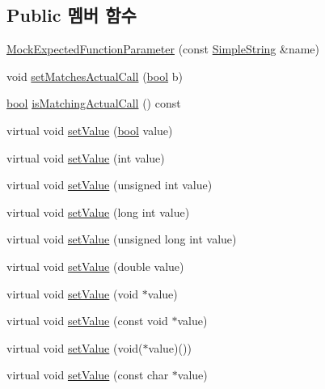 \subsection*{Public 멤버 함수}
\begin{DoxyCompactItemize}
\item 
\hyperlink{class_mock_checked_expected_call_1_1_mock_expected_function_parameter_aed30108e93c74e559acf61e736449ac5}{Mock\+Expected\+Function\+Parameter} (const \hyperlink{class_simple_string}{Simple\+String} \&name)
\item 
void \hyperlink{class_mock_checked_expected_call_1_1_mock_expected_function_parameter_a90891b095c6247152fbb192e4aa10d05}{set\+Matches\+Actual\+Call} (\hyperlink{avb__gptp_8h_af6a258d8f3ee5206d682d799316314b1}{bool} b)
\item 
\hyperlink{avb__gptp_8h_af6a258d8f3ee5206d682d799316314b1}{bool} \hyperlink{class_mock_checked_expected_call_1_1_mock_expected_function_parameter_a36ffbde5a157c291c77c64b690005df6}{is\+Matching\+Actual\+Call} () const 
\item 
virtual void \hyperlink{class_mock_named_value_ae803b3348fa7076308d852bbdeea0d74}{set\+Value} (\hyperlink{avb__gptp_8h_af6a258d8f3ee5206d682d799316314b1}{bool} value)
\item 
virtual void \hyperlink{class_mock_named_value_a23d79e21b8ed72e19278ca31d47b8c87}{set\+Value} (int value)
\item 
virtual void \hyperlink{class_mock_named_value_ae7edcc0e8f39abf14760f786f679e267}{set\+Value} (unsigned int value)
\item 
virtual void \hyperlink{class_mock_named_value_a219051cd58fc476fb523917951ea2dbc}{set\+Value} (long int value)
\item 
virtual void \hyperlink{class_mock_named_value_aabf6703752baf0428af50c510dba08e1}{set\+Value} (unsigned long int value)
\item 
virtual void \hyperlink{class_mock_named_value_a1a31743bc7def7cf7fdad044c84d9268}{set\+Value} (double value)
\item 
virtual void \hyperlink{class_mock_named_value_a07b7cbbed6af178e5979a7347472a483}{set\+Value} (void $\ast$value)
\item 
virtual void \hyperlink{class_mock_named_value_a65bd35656fedd840347291be97187272}{set\+Value} (const void $\ast$value)
\item 
virtual void \hyperlink{class_mock_named_value_aad403084582707f858d991dd96d005c5}{set\+Value} (void($\ast$value)())
\item 
virtual void \hyperlink{class_mock_named_value_a4576bd0dc9301755fe5ddb96b28785f7}{set\+Value} (const char $\ast$value)

\end{DoxyCompactItemize}
